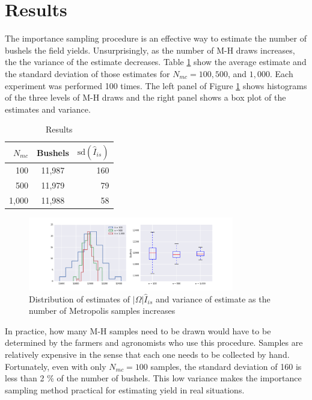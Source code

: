 \documentclass{article} %
\begin{document}
\section{Results}

The importance sampling procedure is an effective way to estimate the number of bushels the field yields. Unsurprisingly, as the number of M-H draws increases, the the variance of the estimate decreases. Table \ref{tab:results} show the average estimate and the standard deviation of those estimates for $N_{mc} = 100, 500$, and $1,000$. Each experiment was performed 100 times. The left panel of Figure \ref{fig:results} shows histograms of the three levels of M-H draws and the right panel shows a box plot of the estimates and variance.

\begin{table}[H]
\begin{center}
\caption{Results}%
\begin{tabular}{rcr}
\hline
$N_{mc}$ & Bushels &  $\textrm{sd}(\hat{I}_{is})$ \\
\hline
100   & 11,987 & 160 \\
500   & 11,979 & 79 \\
1,000 & 11,988 & 58\\
\hline
\end{tabular}
\label{tab:results}
\end{center}
\end{table}

\begin{figure}
\begin{center}
\includegraphics[width=0.8\textwidth]{figures/results}
\caption{Distribution of estimates of $|\Omega|\hat{I}_{is}$ and variance of estimate as the number of Metropolis samples increases}%
\label{fig:results}
\end{center}
\end{figure}

In practice, how many M-H samples need to be drawn would have to be determined by the farmers and agronomists who use this procedure. Samples are relatively expensive in the sense that each one needs to be collected by hand. Fortunately, even with only $N_{mc}= 100$ samples, the standard deviation of 160 is less than 2 \% of the number of bushels. This low variance makes the importance sampling method practical for estimating yield in real situations.
\end{document}
